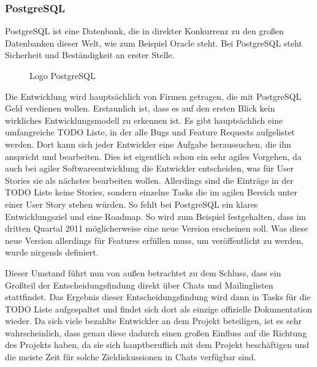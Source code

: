 \subsubsection{PostgreSQL}
PostgreSQL ist eine Datenbank, die in direkter Konkurrenz zu den großen Datenbanken dieser Welt, wie zum Beispiel Oracle steht. \cite{bib:pg-oracle} Bei PostgreSQL steht Sicherheit und Beständigkeit an erster Stelle.
\begin{figure}[h]
	\centering
	\caption{Logo PostgreSQL \cite{bib:pg-logo}}
	\label{pgLogo}
\end{figure}
Die Entwicklung wird hauptsächlich von Firmen getragen, die mit Post\-gre\-SQL Geld verdienen wollen. \cite{bib:pg-contrib} Erstaunlich ist, dass es auf den ersten Blick kein wirkliches Entwicklungsmodell zu erkennen ist. Es gibt hauptsächlich eine umfangreiche TODO Liste, in der alle Bugs und Feature Requests aufgelistet werden. \cite{bib:pg-todo} Dort kann sich jeder Entwickler eine Aufgabe heraussuchen, die ihn anspricht und bearbeiten. Dies ist eigentlich schon ein sehr agiles Vorgehen, da auch bei agiler Softwareentwicklung die Entwickler entscheiden, was für User Stories sie als nächstes bearbeiten wollen. Allerdings sind die Einträge in der TODO Liste keine Stories, sondern einzelne Tasks die im agilen Bereich unter einer User Story stehen würden. So fehlt bei PostgreSQL ein klares Entwicklungsziel und eine Roadmap. So wird zum Beispiel festgehalten, dass im dritten Quartal 2011 möglicherweise eine neue Version erscheinen soll. Was diese neue Version allerdings für Features erfüllen muss, um veröffentlicht zu werden, wurde nirgends definiert. \cite{bib:pg-roadmap}

Dieser Umstand führt nun von außen betrachtet zu dem Schluss, dass ein Großteil der Entscheidungsfindung direkt über Chats und Mailinglisten stattfindet. Das Ergebnis dieser Entscheidungsfindung wird dann in Tasks für die TODO Liste aufgespaltet und findet sich dort als einzige offizielle Dokumentation wieder. Da sich viele bezahlte Entwickler an dem Projekt beteiligen, ist es sehr wahrscheinlich, dass genau diese dadurch einen großen Einfluss auf die Richtung des Projekts haben, da sie sich hauptberuflich mit dem Projekt beschäftigen und die meiste Zeit für solche Zieldiskussionen in Chats verfügbar sind.

